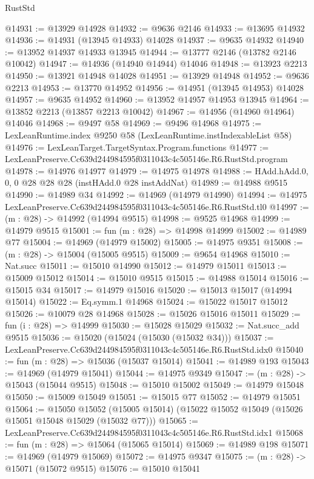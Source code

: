 \begin{lexlean}{RustStd}
\begin{coremodule}
@14931 := @13929 @14928
@14932 := @9636 @2146
@14933 := @13695 @14932
@14936 := @14931 (@13945 @14933) @14028
@14937 := @9635 @14932
@14940 := @13952 @14937 @14933 @13945
@14944 := @13777 @2146 (@13782 @2146 @10042)
@14947 := @14936 (@14940 @14944) @14046
@14948 := @13923 @2213
@14950 := @13921 @14948 @14028
@14951 := @13929 @14948
@14952 := @9636 @2213
@14953 := @13770 @14952
@14956 := @14951 (@13945 @14953) @14028
@14957 := @9635 @14952
@14960 := @13952 @14957 @14953 @13945
@14964 := @13852 @2213 (@13857 @2213 @10042)
@14967 := @14956 (@14960 @14964) @14046
@14968 := @9497 @58
@14969 := @9496 @14968
@14975 := LexLeanRuntime.index @9250 @58 (LexLeanRuntime.instIndexableList @58)
@14976 := LexLeanTarget.TargetSyntax.Program.functions
@14977 := LexLeanPreserve.Cc639d244984595f0311043c4c505146e.R6.RustStd.program
@14978 := @14976 @14977
@14979 := @14975 @14978
@14988 := HAdd.hAdd.{0, 0, 0} @28 @28 @28 (instHAdd.{0} @28 instAddNat)
@14989 := @14988 @9515
@14990 := @14989 @34
@14992 := @14969 (@14979 @14990)
@14994 := @14975 LexLeanPreserve.Cc639d244984595f0311043c4c505146e.R6.RustStd.tl0
@14997 := (m : @28) -> @14992 (@14994 @9515)
@14998 := @9525 @14968
@14999 := @14979 @9515
@15001 := fun (m : @28) => @14998 @14999
@15002 := @14989 @77
@15004 := @14969 (@14979 @15002)
@15005 := @14975 @9351
@15008 := (m : @28) -> @15004 (@15005 @9515)
@15009 := @9654 @14968
@15010 := Nat.succ
@15011 := @15010 @14990
@15012 := @14979 @15011
@15013 := @15009 @15012
@15014 := @15010 @9515
@15015 := @14988 @15014
@15016 := @15015 @34
@15017 := @14979 @15016
@15020 := @15013 @15017 (@14994 @15014)
@15022 := Eq.symm.{1} @14968
@15024 := @15022 @15017 @15012
@15026 := @10079 @28 @14968
@15028 := @15026 @15016 @15011
@15029 := fun (i : @28) => @14999
@15030 := @15028 @15029
@15032 := Nat.succ_add @9515
@15036 := @15020 (@15024 (@15030 (@15032 @34)))
@15037 := LexLeanPreserve.Cc639d244984595f0311043c4c505146e.R6.RustStd.idx0
@15040 := fun (m : @28) => @15036 (@15037 @15014)
@15041 := @14989 @193
@15043 := @14969 (@14979 @15041)
@15044 := @14975 @9349
@15047 := (m : @28) -> @15043 (@15044 @9515)
@15048 := @15010 @15002
@15049 := @14979 @15048
@15050 := @15009 @15049
@15051 := @15015 @77
@15052 := @14979 @15051
@15064 := @15050
    @15052
    (@15005 @15014)
    (@15022 @15052 @15049 (@15026 @15051 @15048 @15029 (@15032 @77)))
@15065 := LexLeanPreserve.Cc639d244984595f0311043c4c505146e.R6.RustStd.idx1
@15068 := fun (m : @28) => @15064 (@15065 @15014)
@15069 := @14989 @198
@15071 := @14969 (@14979 @15069)
@15072 := @14975 @9347
@15075 := (m : @28) -> @15071 (@15072 @9515)
@15076 := @15010 @15041

\end{coremodule}
\end{lexlean}
